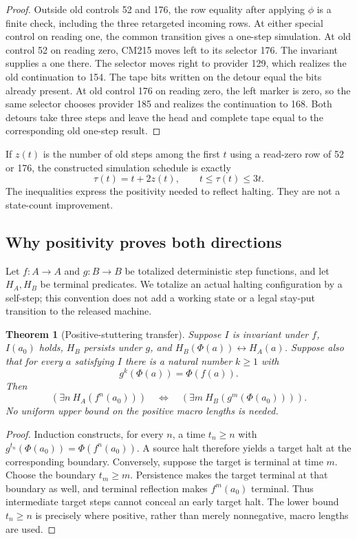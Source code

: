 \documentclass[11pt,letterpaper]{article}
\newtheorem{theorem}{Theorem}[section]
\theoremstyle{definition}\newtheorem{definition}[theorem]{Definition}
\theoremstyle{remark}\newtheorem{remark}[theorem]{Remark}
\begin{document}
\begin{proof}
Outside old controls 52 and 176, the row equality after applying $\phi$ is
a finite check, including the three retargeted incoming rows. At either
special control on reading one, the common transition gives a one-step
simulation. At old control 52 on reading zero, CM215 moves left to its
selector 176. The invariant supplies a one there. The selector moves right
to provider 129, which realizes the old continuation to 154. The tape bits
written on the detour equal the bits already present. At old control 176
on reading zero, the left marker is zero, so the same selector chooses
provider 185 and realizes the continuation to 168. Both detours take three
steps and leave the head and complete tape equal to the corresponding old
one-step result.
\end{proof}

If $z(t)$ is the number of old steps among the first $t$ using a read-zero
row of 52 or 176, the constructed simulation schedule is exactly
\[
 \tau(t)=t+2z(t),\qquad t\le\tau(t)\le3t.
\]
The inequalities express the positivity needed to reflect halting. They
are not a state-count improvement.

\subsection{Why positivity proves both directions}

Let $f:A\to A$ and $g:B\to B$ be totalized deterministic step functions,
and let $H_A,H_B$ be terminal predicates. We totalize an actual halting
configuration by a self-step; this convention does not add a working
state or a legal stay-put transition to the released machine.

\begin{theorem}[Positive-stuttering transfer]
Suppose $I$ is invariant under $f$, $I(a_0)$ holds, $H_B$ persists under
$g$, and $H_B(\Phi(a))\leftrightarrow H_A(a)$. Suppose also that for every
$a$ satisfying $I$ there is a natural number $k\ge1$ with
\[
 g^k(\Phi(a))=\Phi(f(a)).
\]
Then
\[
 (\exists n\ H_A(f^n(a_0)))
 \quad\Longleftrightarrow\quad
 (\exists m\ H_B(g^m(\Phi(a_0)))).
\]
No uniform upper bound on the positive macro lengths is needed.
\end{theorem}

\begin{proof}
Induction constructs, for every $n$, a time $t_n\ge n$ with
$g^{t_n}(\Phi(a_0))=\Phi(f^n(a_0))$. A source halt therefore yields a
target halt at the corresponding boundary. Conversely, suppose the target
is terminal at time $m$. Choose the boundary $t_m\ge m$. Persistence makes
the target terminal at that boundary as well, and terminal reflection
makes $f^m(a_0)$ terminal. Thus intermediate target steps cannot conceal
an early target halt. The lower bound $t_n\ge n$ is precisely where
positive, rather than merely nonnegative, macro lengths are used.
\end{proof}
\end{document}
